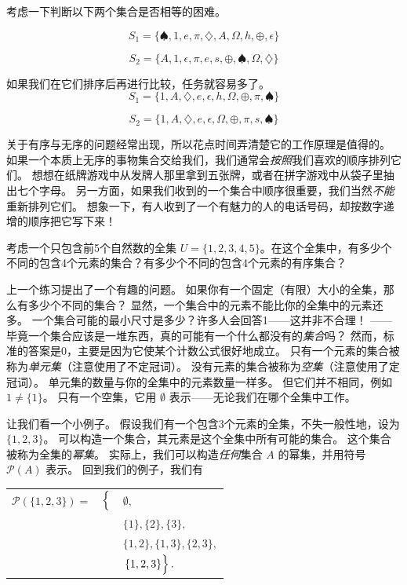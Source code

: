 考虑一下判断以下两个集合是否相等的困难。

\vfill

\[ S_1 = \{ \spadesuit, 1, e, \pi, \diamondsuit, A, \Omega, h, \oplus, \epsilon \} \]

\vfill

\[ S_2 = \{ A, 1, \epsilon, \pi, e, s, \oplus,  \spadesuit, \Omega, \diamondsuit \} \]

\newpage
如果我们在它们排序后再进行比较，任务就容易多了。
\[ S_1 = \{1, A, \diamondsuit, e, \epsilon, h, \Omega, \oplus, \pi, \spadesuit \} \]

\[ S_2 = \{1, A, \diamondsuit, e, \epsilon, \Omega, \oplus, \pi, s, \spadesuit \} \]

关于有序与无序的问题经常出现，所以花点时间弄清楚它的工作原理是值得的。
如果一个本质上无序的事物集合交给我们，我们通常会\emph{按照}我们喜欢的顺序排列它们。
想想在纸牌游戏中从发牌人那里拿到五张牌，或者在拼字游戏中从袋子里抽出七个字母。
另一方面，如果我们收到的一个集合中顺序很重要，我们当然\emph{不能}重新排列它们。
想象一下，有人收到了一个有魅力的人的电话号码，却按数字递增的顺序把它写下来！
\begin{exer}
考虑一个只包含前5个自然数的全集 $U = \{ 1, 2, 3, 4, 5 \}$。在这个全集中，有多少个不同的包含4个元素的集合？有多少个不同的包含4个元素的有序集合？
\end{exer}

上一个练习提出了一个有趣的问题。
如果你有一个固定（有限）大小的全集，那么有多少个不同的集合？
显然，一个集合中的元素不能比你的全集中的元素还多。
一个集合可能的最小尺寸是多少？许多人会回答1——这并非不合理！
——毕竟一个集合应该是一堆东西，真的可能有一个什么都没有的\emph{集合}吗？
然而，标准的答案是0，主要是因为它使某个计数公式很好地成立。
只有一个元素的集合被称为\emph{单元集}（注意使用了不定冠词）。
没有元素的集合被称为\emph{空集}（注意使用了定冠词）。
单元集的数量与你的全集中的元素数量一样多。
但它们并不相同，例如 $1 \neq \{ 1 \}$。
只有一个空集，它用 $\emptyset$ 表示——无论我们在哪个全集中工作。

让我们看一个小例子。
假设我们有一个包含3个元素的全集，不失一般性地，设为 $\{1, 2, 3\}$。
可以构造一个集合，其元素是这个全集中所有可能的集合。
这个集合被称为全集的\emph{幂集}。
实际上，我们可以构造\emph{任何}集合 $A$ 的幂集，并用符号 ${\mathcal P}(A)$ 表示。
回到我们的例子，我们有

\begin{center}
\begin{tabular}{rcl}
 ${\mathcal P}(\{1, 2, 3 \}) = $ & $\left\{ \rule{0pt}{10pt}  \right.$ & $\emptyset,$ \\
  & & $\{ 1 \},  \{ 2 \},  \{ 3 \},$ \\
  & & $\{ 1, 2 \},  \{ 1, 3 \},  \{ 2, 3 \},$ \\
  & & $\left. \{ 1, 2, 3 \} \rule{0pt}{10pt} \right\}.$
\end{tabular}
\end{center}

